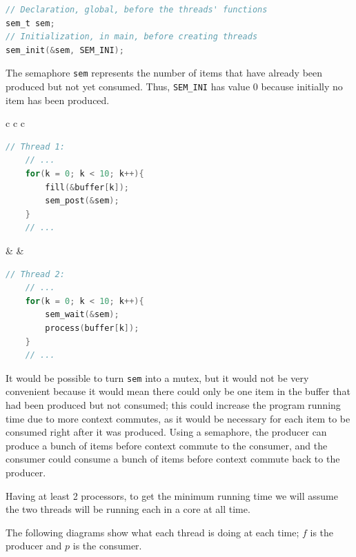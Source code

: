 \documentclass{sope}
\begin{document}
\begin{lstlisting}[language=C]
// Declaration, global, before the threads' functions
sem_t sem;
// Initialization, in main, before creating threads
sem_init(&sem, SEM_INI);
\end{lstlisting}

The semaphore \texttt{sem} represents the number of items that have already been produced but not yet consumed. Thus, \texttt{SEM\_INI} has value 0 because initially no item has been produced.

\begin{center}
    \begin{tabular}{c c c}
        \begin{minipage}[t]{73mm}\begin{lstlisting}[language=C]
// Thread 1:
    // ...
    for(k = 0; k < 10; k++){
        fill(&buffer[k]);
        sem_post(&sem);
    }
    // ...
        \end{lstlisting}\end{minipage} & &
        \begin{minipage}[t]{73mm}\begin{lstlisting}[language=C]
// Thread 2:
    // ...
    for(k = 0; k < 10; k++){
        sem_wait(&sem);
        process(buffer[k]);
    }
    // ...
        \end{lstlisting}\end{minipage}
    \end{tabular}
\end{center}

It would be possible to turn \texttt{sem} into a mutex, but it would not be very convenient because it would mean there could only be one item in the buffer that had been produced but not consumed; this could increase the program running time due to more context commutes, as it would be necessary for each item to be consumed right after it was produced. Using a semaphore, the producer can produce a bunch of items before context commute to the consumer, and the consumer could consume a bunch of items before context commute back to the producer.

Having at least 2 processors, to get the minimum running time we will assume the two threads will be running each in a core at all time.

The following diagrams show what each thread is doing at each time; $f$ is the producer and $p$ is the consumer.
\end{document}

